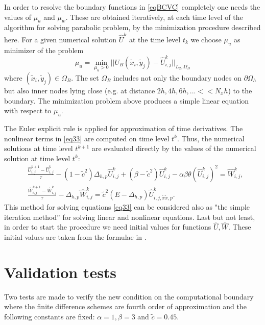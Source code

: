 \documentclass[12pt]{article}
\newcommand{\dO}{\partial\Omega_{h}}
\theoremstyle{theorem}
\theoremstyle{defi}
\begin{document}
In order to resolve the boundary functions in \ref{eqBCVC} completely one needs the values of $\mu_u$  and $\mu_w$. These are obtained iteratively, at each time level of the algorithm for solving parabolic problem, by the minimization procedure described here. 
	For a given numerical solution $\widehat U ^k$  at the time level  $t_k$ we choose $\mu_u$  as minimizer of the problem
\begin{equation}\label{minP}
\mu_u = \min_{ \mu_u > 0 } || U_B( \tilde x_i, \tilde y_j) - \widehat U ^k_{i,j} ||_{L_2,\Omega_B}
\end{equation}
where  $( \tilde x_i, \tilde y_j) \in \Omega_B$. The set $\Omega_B$ includes not only the boundary nodes on $\dO$ but also inner nodes lying close (e.g. at distance $2h, 4h, 6h, ... << N_x h $) to the boundary. The minimization problem above produces a simple linear equation with respect to $\mu_u$.

The Euler explicit rule is applied for approximation of  time derivatives. The nonlinear terms in \ref{eq33} are computed on time level $t^k$. Thus, the numerical solutions at time level $t^{k+1}$ are evaluated directly by the values of the numerical solution at time level $t^k$:  
 \begin{equation}\label{eq34}
 \begin{split}
   &\frac {\widehat{U}_{i,j}^{k+1}-\widehat{U}_{i,j}^{k}}{\tau}- (1-\tilde c^2 ) \Delta_{h,p} \widehat{U} _{i,j}^{k}+  (\beta-\tilde c^2 ) \widehat{U}_{i,j}^{k} - \alpha \beta \theta (\widehat{U}_{i,j}^{k})^2 = \widehat{W}_{i,j}^{k}, \\
  &\frac  {\widehat{W}_{i,j}^{k+1} -\widehat{W}_{i,j}^{k}} {\tau} - \Delta_{h,p} \widehat{W}_{i,j}^{k} =  \tilde c^2 (E- \Delta_{h,p})       
    \widehat{U}_{i,j,{\tilde x \tilde x,p}}^{k}. 
\end{split}
\end{equation}
This method for solving equations 
\ref{eq33} can be considered also as "the simple iteration method'' for solving linear and nonlinear equations.
Last but not least, in order to start the procedure we need initial values for functions $\widehat{U},\widehat{W}$. These initial values are taken from the formulae in \cite{ref10}.

\section{Validation tests}

Two tests are made to verify the new condition on the computational boundary where the finite difference schemes are fourth order of approximation and the following constants are fixed: $\alpha = 1, \beta = 3$   and   $ \tilde c = 0.45$.
\end{document}
